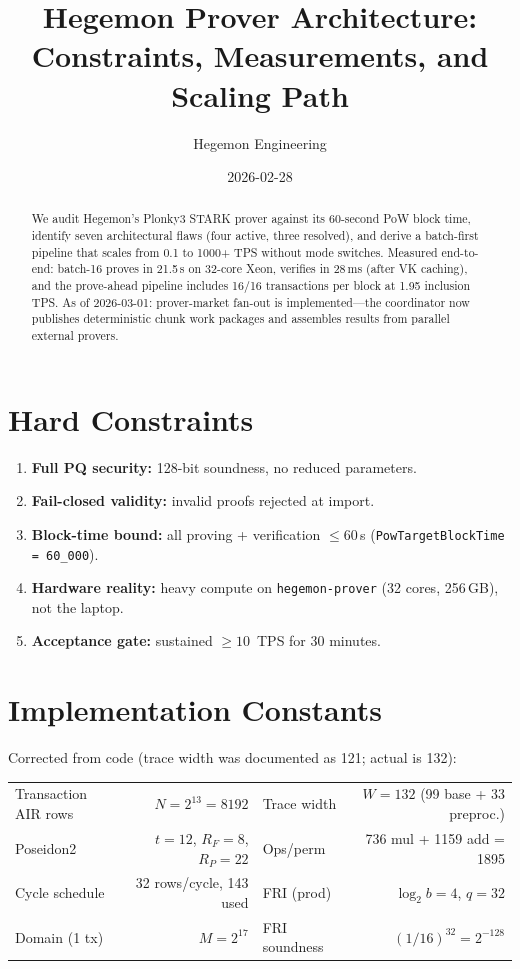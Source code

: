 \documentclass[11pt]{article}
\title{Hegemon Prover Architecture:\\Constraints, Measurements, and Scaling Path}
\author{Hegemon Engineering}
\date{2026-02-28}
\begin{document}
\maketitle

\begin{abstract}
We audit Hegemon's Plonky3 STARK prover against its 60-second PoW block
time, identify seven architectural flaws (four active, three resolved), and
derive a batch-first pipeline that scales from 0.1 to 1000+ TPS without
mode switches. Measured end-to-end: batch-16 proves in 21.5\,s on
32-core Xeon, verifies in 28\,ms (after VK caching), and the prove-ahead
pipeline includes 16/16 transactions per block at 1.95 inclusion TPS.
As of 2026-03-01: prover-market fan-out is implemented---the coordinator
now publishes deterministic chunk work packages and assembles results
from parallel external provers.
\end{abstract}

\section{Hard Constraints}

\begin{enumerate}[label=C\arabic*.,leftmargin=2em]
  \item \textbf{Full PQ security:} 128-bit soundness, no reduced parameters.
  \item \textbf{Fail-closed validity:} invalid proofs rejected at import.
  \item \textbf{Block-time bound:} all proving + verification $\le 60$\,s
        (\texttt{PowTargetBlockTime = 60\_000}).
  \item \textbf{Hardware reality:} heavy compute on \texttt{hegemon-prover}
        (32 cores, 256\,GB), not the laptop.
  \item \textbf{Acceptance gate:} sustained $\ge 10$~TPS for 30 minutes.
\end{enumerate}

\section{Implementation Constants}

Corrected from code (trace width was documented as 121; actual is 132):

\begin{center}
\begin{tabular}{@{}lr@{\qquad}lr@{}}
\toprule
Transaction AIR rows & $N = 2^{13} = 8192$ &
  Trace width & $W = 132$ (99 base + 33 preproc.) \\
Poseidon2 & $t{=}12$, $R_F{=}8$, $R_P{=}22$ &
  Ops/perm & 736 mul + 1159 add = 1895 \\
Cycle schedule & 32 rows/cycle, 143 used &
  FRI (prod) & $\log_2 b = 4$, $q = 32$ \\
Domain (1 tx) & $M = 2^{17}$ &
  FRI soundness & $(1/16)^{32} = 2^{-128}$ \\
\bottomrule
\end{tabular}
\end{center}
\end{document}

